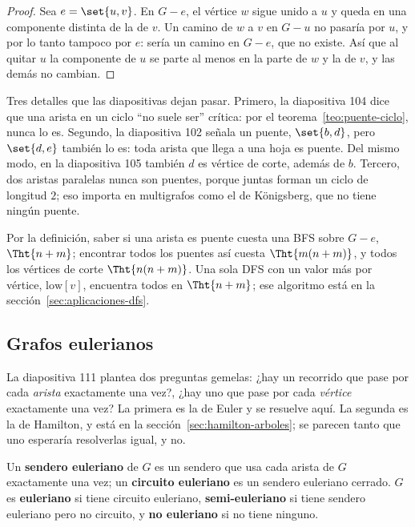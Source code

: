 \documentclass[11pt,letterpaper]{article}
\begin{document}
\begin{proof}
  Sea $e = \set{u, v}$. En $G - e$, el vértice $w$ sigue unido a $u$ y
  queda en una componente distinta de la de $v$. Un camino de $w$ a
  $v$ en $G - u$ no pasaría por $u$, y por lo tanto tampoco por $e$:
  sería un camino en $G - e$, que no existe.
  Así que al quitar $u$ la componente de $u$ se parte al menos en la
  parte de $w$ y la de $v$, y las demás no cambian.
\end{proof}

\begin{ojo}
  Tres detalles que las diapositivas dejan pasar. Primero, la
  diapositiva 104 dice que una arista en un ciclo ``no suele ser''
  crítica: por el teorema~\ref{teo:puente-ciclo}, nunca lo es. Segundo,
  la diapositiva 102 señala un puente, $\set{b, d}$, pero
  $\set{d, e}$ también lo es: toda arista que llega a una hoja es
  puente. Del mismo modo, en la diapositiva 105 también $d$ es vértice
  de corte, además de $b$. Tercero, dos aristas paralelas nunca son
  puentes, porque juntas forman un ciclo de longitud $2$; eso importa
  en multigrafos como el de Königsberg, que no tiene ningún puente.
\end{ojo}

Por la definición, saber si una arista es puente cuesta una BFS sobre
$G - e$, $\Tht{n + m}$; encontrar todos los puentes así cuesta
$\Tht{m(n + m)}$, y todos los vértices de corte $\Tht{n(n + m)}$. Una
sola DFS con un valor más por vértice, $\text{low}[v]$, encuentra
todos en $\Tht{n + m}$; ese algoritmo está en la
sección~\ref{sec:aplicaciones-dfs}.


\subsection*{Grafos eulerianos}

La diapositiva 111 plantea dos preguntas gemelas: ¿hay un recorrido
que pase por cada \emph{arista} exactamente una vez?, ¿hay uno que pase
por cada \emph{vértice} exactamente una vez? La primera es la de
Euler y se resuelve aquí. La segunda es la de Hamilton, y está en la
sección~\ref{sec:hamilton-arboles}; se parecen tanto que uno esperaría
resolverlas igual, y no.

\begin{definicion}
  \label{def:euleriano}
  Un \textbf{sendero euleriano} de $G$ es un sendero que usa cada
  arista de $G$ exactamente una vez; un \textbf{circuito euleriano} es
  un sendero euleriano cerrado. $G$ es \textbf{euleriano} si tiene
  circuito euleriano, \textbf{semi-euleriano} si tiene sendero
  euleriano pero no circuito, y \textbf{no euleriano} si no tiene
  ninguno.
\end{definicion}
\end{document}
